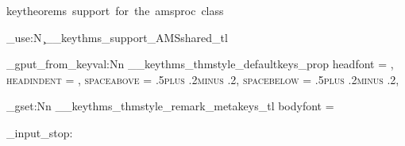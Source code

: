   {keytheorems~support~for~the~amsproc~class}

\tl_use:N \c__keythms_support_AMSshared_tl

\prop_gput_from_keyval:Nn \g__keythms_thmstyle_defaultkeys_prop
  {
    headfont   = \scshape,
    headindent = \parindent,
    spaceabove = .5\baselineskip plus .2\baselineskip minus .2\baselineskip,
    spacebelow = .5\baselineskip plus .2\baselineskip minus .2\baselineskip,
  }

\tl_gset:Nn \g__keythms_thmstyle_remark_metakeys_tl { bodyfont = \normalfont }

\file_input_stop: